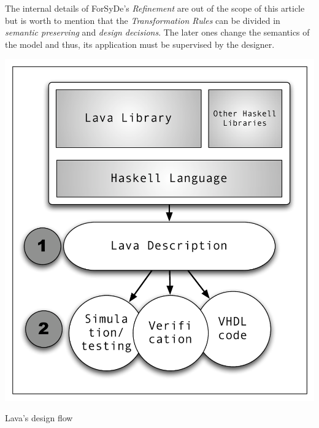 \documentclass[a4paper,twoside,11pt]{article}
\begin{document}
\begin{body}
\begin{enumerate}[1)]
    The internal details of  ForSyDe's \textit{Refinement} are out of
    the scope of this article but is worth to mention that the
    \textit{Transformation Rules} can be divided in \textit{semantic
      preserving} and \textit{design decisions}. The later ones
    change the semantics of the model and thus, its application must be
    supervised by the designer.
\end{enumerate}
\begin{figurehere}
  \includegraphics[width=\columnwidth]{figures/Lava.pdf}
  \caption{Lava's design flow}
  \label{fig:lava}
\end{figurehere}


\end{body}
\end{document}
